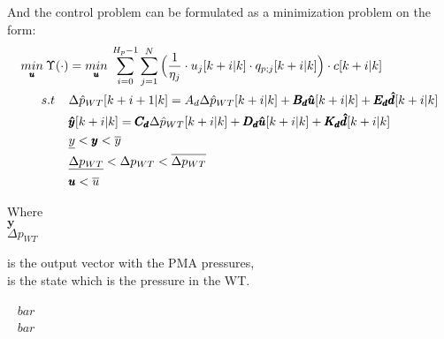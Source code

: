 And the control problem can be formulated as a minimization problem on the form:
\begin{align}
\underset{\pmb{u}}{min} \:  \Upsilon(\cdot) &= \underset{\pmb{u}}{min} \: \sum_{i=0}^{H_p-1} \sum_{j=1}^{N} \Big(\frac{1}{\eta_j} \cdot u_j[k+i|k] \cdot q_{p;j}[k+i|k]\Big)\cdot c[k+i|k] \label{eqcost1} \\
%
\newline
s.t \:\:\:\:\: & \Delta \hat{p}_{WT} [k+i+1|k] = A_d \Delta \hat{p}_{WT}[k+i|k]  + \pmb{B_d} \pmb{\hat{u}}[k+i|k] + \pmb{E_d} \pmb{\hat{d}}[k+i|k]  \\
%
&\pmb{\hat{y}}[k+i|k] = \pmb{C_d} \Delta \hat{p}_{WT}[k+i|k] + \pmb{D_d} \pmb{\hat{u}}[k+i|k] + \pmb{K_d} \pmb{\hat{d}}[k+i|k] \\
%
& \underline{y} < \pmb{y} < \overline{y} \\
%
& \underline{\Delta p_{WT}} < \Delta p_{WT} < \overline{\Delta p_{WT}} \\
%
& \pmb{u} < \overline{u} \label{eqconst2} 
\end{align}

 \begin{minipage}[t]{0.24\textwidth}
 Where\\
 \hspace*{8mm} $\pmb{y}$ \\
 \hspace*{8mm} $\Delta p_{WT}$ 
 \end{minipage}
 \begin{minipage}[t]{0.63\textwidth}
 \vspace*{2mm}
 is the output vector with the PMA pressures,\\
 is the state which is the pressure in the WT.
 \end{minipage}
 \begin{minipage}[t]{0.10\textwidth}
 \vspace*{2mm}
 \textcolor{White}{te}$\unit{bar}$\\
 \textcolor{White}{te}$\unit{bar}$
 \end{minipage}

